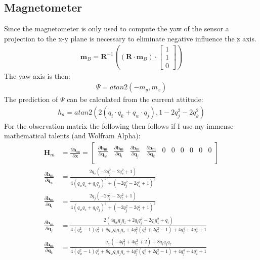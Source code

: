 \documentclass[10pt,a4paper]{article}
\newcommand{\M}[1]{\mathbf{#1}}
\newcommand{\V}[1]{\mathbf{#1}}
\begin{document}
\subsection{Magnetometer}
Since the magnetometer is only used to compute the yaw of the sensor a projection to the x-y plane is necessary to eliminate negative influence the z axis.
\begin{align}
  \V m_B = \M R^{-1} \left ((\M R \cdot \V m_B) \cdot
  \begin{bmatrix}
    1 \\ 1 \\ 0
  \end{bmatrix} \right)
\end{align}
The yaw axis is then: 
\begin{align}
  \Psi = atan2 (- m_y, m_x)
\end{align}
The prediction of $\Psi$ can be calculated from the current attitude: 
\begin{align}
  h_a = atan2 (2 (q_i \cdot q_k + q_w \cdot q_j), 1 - 2  q_j^2 - 2 q_k^2)
\end{align}
For the observation matrix the following then follows if I use my immense mathematical talents (and Wolfram Alpha):
\begin{align}
  \M H_m &=  \frac {\partial \V {h_m}}  {\partial \V x} = \begin{bmatrix}
    \frac { \partial \V {h_m}}  {\partial \V q_w} &
    \frac { \partial \V {h_m}}  {\partial \V q_i} &
    \frac { \partial \V {h_m}}  {\partial \V q_j} &
    \frac { \partial \V {h_m}}  {\partial \V q_k} &
    0 & 0 & 0& 0 & 0 & 0 \\
  \end{bmatrix} \\
    \frac { \partial \V {h_m}}  {\partial \V q_w} &= \frac { 2 q_z (-2 q_j^2 - 2 q_z^2 + 1)}{4 (q_w q_z + q_i q_j)^2 + (-2 q_j^2 - 2 q_z^2 + 1)^2} \\ 
    \frac { \partial \V {h_m}}  {\partial \V q_i} &= \frac {2 q_j (-2 q_j^2 - 2 q_z^2 + 1)}{4 (q_w q_z + q_i q_j)^2 + (-2 q_j^2 - 2 q_z^2 + 1)^2} \\
    \frac { \partial \V {h_m}}  {\partial \V q_j} &= \frac {2 (4 q_w q_j q_z + 2 q_i q_j^2 - 2 q_i q_z^2 + q_i)}{4 (q_w^2 - 1) q_z^2 + 8 q_w q_i q_j q_z + 4 q_j^2 (q_i^2 + 2 q_z^2 - 1) + 4 q_j^4 + 4 q_z^4 + 1} \\
    \frac { \partial \V {h_m}}  {\partial \V q_k} &= \frac{ q_w (-4 q_j^2 + 4 q_z^2 + 2) + 8 q_i q_j q_z}{4 (q_w^2 - 1) q_z^2 + 8 q_w q_i q_j q_z + 4 q_j^2 (q_i^2 + 2 q_z^2 - 1) + 4 q_j^4 + 4 q_z^4 + 1}
\end{align}
\end{document}
